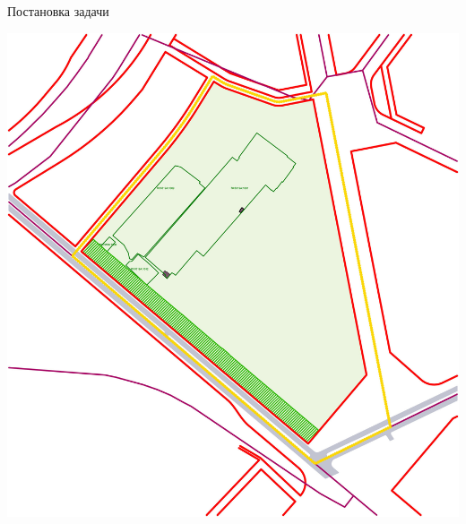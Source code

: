 \documentclass[14pt, fleqn, xcolor={dvipsnames, table}]{beamer}
\begin{document}
\begin{frame}{Постановка задачи}
\begin{center}
                \includegraphics[scale=0.27]{empty.jpg}
            \end{center}                 
        \end{frame}
        
\end{document}
